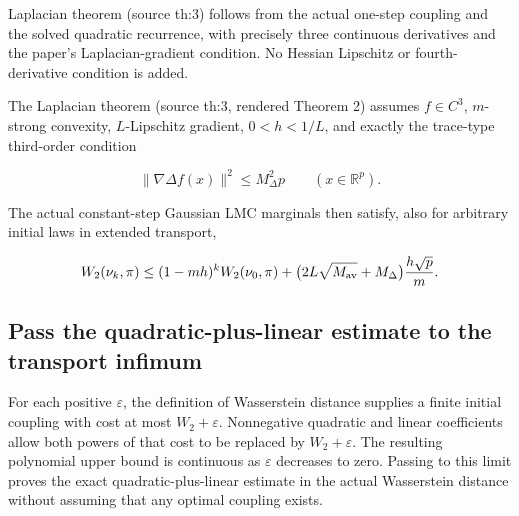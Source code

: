 \documentclass[11pt,a4paper]{report}
\begin{document}
Laplacian theorem (source th:3) follows from the actual one-step coupling and the solved quadratic recurrence, with precisely three continuous derivatives and the paper’s Laplacian-gradient condition. No Hessian Lipschitz or fourth-derivative condition is added.



The Laplacian theorem (source th:3, rendered Theorem 2) assumes \(f\in C^3\), \(m\)-strong convexity, \(L\)-Lipschitz gradient, \(0<h<1/L\), and exactly the trace-type third-order condition


\[\|\nabla\Delta f(x)\|^2\le M_\Delta^2p\qquad(x\in\mathbb R^p).\]


The actual constant-step Gaussian LMC marginals then satisfy, also for arbitrary initial laws in extended transport,


\[W_2(\nu_k,\pi)\le(1-mh)^kW_2(\nu_0,\pi)+\bigl(2L\sqrt{M_{\rm av}}+M_\Delta\bigr)\frac{h\sqrt p}{m}.\]\subsection{\texorpdfstring{Pass the quadratic-plus-linear estimate to the transport infimum}{Pass the quadratic-plus-linear estimate to the transport infimum}}
\label{report-step-AverageLMC-LaplacianTheorem-lean-1}


For each positive \(\varepsilon\), the definition of Wasserstein distance supplies a finite initial coupling with cost at most \(W_{2}+\varepsilon\). Nonnegative quadratic and linear coefficients allow both powers of that cost to be replaced by \(W_{2}+\varepsilon\). The resulting polynomial upper bound is continuous as \(\varepsilon\) decreases to zero. Passing to this limit proves the exact quadratic-plus-linear estimate in the actual Wasserstein distance without assuming that any optimal coupling exists.
\end{document}
